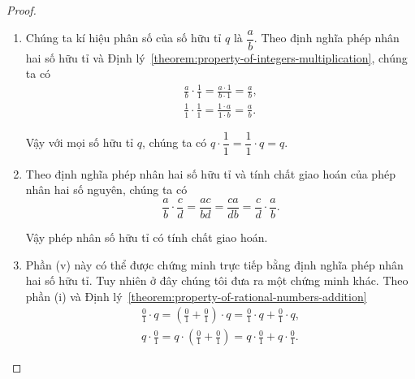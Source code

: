 \begin{proof}
\begin{enumerate}[label={(\roman*)}]
\begin{align*}
                                                                         & \text{(theo tính chất phân phối của phép nhân với phép cộng số nguyên)} \\
                                                                         & = \frac{x(ad)}{y(bd)} + \frac{x(bc)}{y(bd)} \quad \text{(theo Định lý~\ref{theorem:same-denominator})}                    \\
                                                                         & = \frac{(xa)d}{(yb)d} + \frac{b(xc)}{b(yd)}                             \\
                                                                         & \text{(theo tính chất kết hợp và giao hoán của phép nhân số nguyên)}    \\
                                                                         & = \frac{xa}{yb} + \frac{xc}{yd} \quad \text{(theo Định lý~\ref{theorem:fundamental-property-of-fraction})}    \\
                                                                         & = \frac{x}{y}\cdot\frac{a}{b} + \frac{x}{y}\cdot\frac{c}{d}.
              \end{align*}

              Vậy phép nhân số hữu tỉ có tính chất phân phối với phép cộng số hữu tỉ.
        \item Chúng ta kí hiệu phân số của số hữu tỉ $q$ là $\dfrac{a}{b}$. Theo định nghĩa phép nhân hai số hữu tỉ và Định lý~\ref{theorem:property-of-integers-multiplication}, chúng ta có
              \begin{align*}
                  \frac{a}{b}\cdot\frac{1}{1} = \frac{a\cdot 1}{b\cdot 1} = \frac{a}{b}, \\
                  \frac{1}{1}\cdot\frac{1}{1} = \frac{1\cdot a}{1\cdot b} = \frac{a}{b}.
              \end{align*}

              Vậy với mọi số hữu tỉ $q$, chúng ta có $q\cdot\dfrac{1}{1} = \dfrac{1}{1}\cdot q = q$.
        \item Theo định nghĩa phép nhân hai số hữu tỉ và tính chất giao hoán của phép nhân hai số nguyên, chúng ta có
              \[
                  \frac{a}{b}\cdot\frac{c}{d} = \frac{ac}{bd} = \frac{ca}{db} = \frac{c}{d}\cdot\frac{a}{b}.
              \]

              Vậy phép nhân số hữu tỉ có tính chất giao hoán.
        \item Phần (v) này có thể được chứng minh trực tiếp bằng định nghĩa phép nhân hai số hữu tỉ. Tuy nhiên ở đây chúng tôi đưa ra một chứng minh khác. Theo phần (i) và Định lý~\ref{theorem:property-of-rational-numbers-addition}
              \[
                  \begin{split}
                      \frac{0}{1}\cdot q = \left(\frac{0}{1} + \frac{0}{1}\right)\cdot q = \frac{0}{1}\cdot q + \frac{0}{1}\cdot q, \\
                      q\cdot \frac{0}{1} = q\cdot \left(\frac{0}{1} + \frac{0}{1}\right) = q\cdot \frac{0}{1} + q\cdot \frac{0}{1}.
                  \end{split}
              \]


\end{enumerate}
\end{proof}
